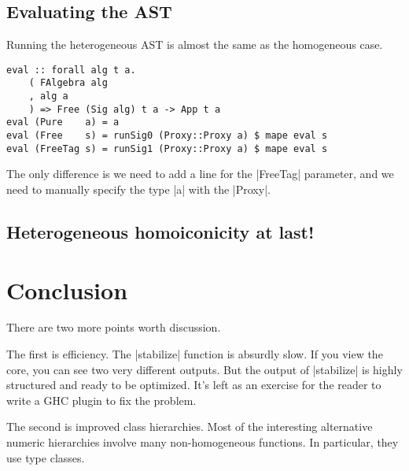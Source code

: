 \documentclass[preprint]{sigplanconf}
\theoremstyle{definition}
\begin{document}
\subsection{Evaluating the AST}
\label{sec:heteval}

Running the heterogeneous AST is almost the same as the homogeneous case.
\begin{lstlisting}
eval :: forall alg t a.
    ( FAlgebra alg
    , alg a
    ) => Free (Sig alg) t a -> App t a
eval (Pure    a) = a
eval (Free    s) = runSig0 (Proxy::Proxy a) $ mape eval s
eval (FreeTag s) = runSig1 (Proxy::Proxy a) $ mape eval s
\end{lstlisting}
The only difference is we need to add a line for the |FreeTag| parameter,
and we need to manually specify the type |a| with the |Proxy|.

\subsection{Heterogeneous homoiconicity at last!}

\section{Conclusion}

There are two more points worth discussion.

The first is efficiency.
The |stabilize| function is absurdly slow.
If you view the core, you can see two very different outputs.
But the output of |stabilize| is highly structured and ready to be optimized.
It's left as an exercise for the reader to write a GHC plugin to fix the problem.

The second is improved class hierarchies.
Most of the interesting alternative numeric hierarchies involve many non-homogeneous functions.
In particular, they use type classes.



%
%
%
%




\end{document}
